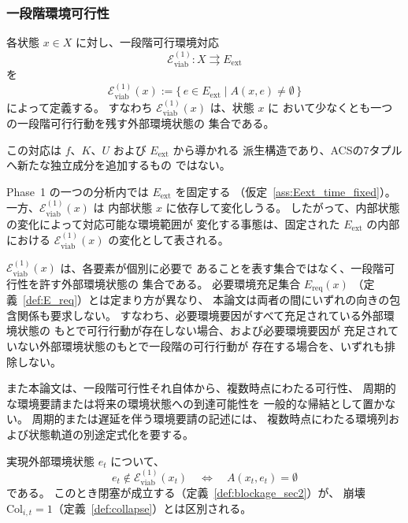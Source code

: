 \subsubsection{一段階環境可行性}

\begin{definition}
\label{def:one_step_viable_environment}
各状態 $x\in X$ に対し、一段階可行環境対応
\[
  \mathcal{E}_{\mathrm{viab}}^{(1)}:X\rightrightarrows E_{\mathrm{ext}}
\]
を
\[
  \mathcal{E}_{\mathrm{viab}}^{(1)}(x)
  :=\{\,e\in E_{\mathrm{ext}}\mid A(x,e)\neq\emptyset\,\}
\]
によって定義する。
すなわち $\mathcal{E}_{\mathrm{viab}}^{(1)}(x)$ は、状態 $x$ に
おいて少なくとも一つの一段階可行行動を残す外部環境状態の
集合である。

この対応は $f$、$K$、$U$ および $E_{\mathrm{ext}}$ から導かれる
派生構造であり、ACSの7タプルへ新たな独立成分を追加するもの
ではない。
\end{definition}

\begin{remark}[一段階可行性と必要環境充足の区別]
\label{rem:fixed_environment_and_state_dependent_viability}
Phase~1 の一つの分析内では $E_{\mathrm{ext}}$ を固定する
（仮定~\ref{ass:Eext_time_fixed}）。
一方、$\mathcal{E}_{\mathrm{viab}}^{(1)}(x)$ は
内部状態 $x$ に依存して変化しうる。
したがって、内部状態の変化によって対応可能な環境範囲が
変化する事態は、固定された $E_{\mathrm{ext}}$ の内部における
$\mathcal{E}_{\mathrm{viab}}^{(1)}(x)$ の変化として表される。

$\mathcal{E}_{\mathrm{viab}}^{(1)}(x)$ は、各要素が個別に必要で
あることを表す集合ではなく、一段階可行性を許す外部環境状態の
集合である。
必要環境充足集合 $E_{\mathrm{req}}(x)$
（定義~\ref{def:E_req}）とは定まり方が異なり、
本論文は両者の間にいずれの向きの包含関係も要求しない。
すなわち、必要環境要因がすべて充足されている外部環境状態の
もとで可行行動が存在しない場合、および必要環境要因が
充足されていない外部環境状態のもとで一段階の可行行動が
存在する場合を、いずれも排除しない。

また本論文は、一段階可行性それ自体から、複数時点にわたる可行性、
周期的な環境要請または将来の環境状態への到達可能性を
一般的な帰結として置かない。
周期的または遅延を伴う環境要請の記述には、
複数時点にわたる環境列および状態軌道の別途定式化を要する。

実現外部環境状態 $e_t$ について、
\[
  e_t\notin\mathcal{E}_{\mathrm{viab}}^{(1)}(x_t)
  \quad\Longleftrightarrow\quad
  A(x_t,e_t)=\emptyset
\]
である。
このとき閉塞が成立する（定義~\ref{def:blockage_sec2}）が、
崩壊 $\mathrm{Col}_{i,t}=1$（定義~\ref{def:collapse}）とは区別される。
\end{remark}

